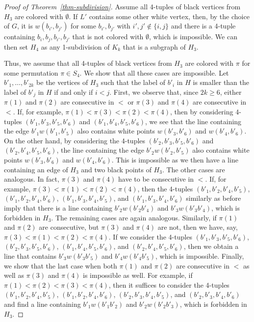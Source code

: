 \documentclass{article}
\begin{document}
\begin{proof}[Proof of Theorem~\ref{thm-subdivision}]
Assume all 4-tuples of black vertices from $H_3$ are colored with $\emptyset$.
If $L'$ contains some other white vertex, then, by the choice of $G$, it is $w(b_{i'},b_{j'})$ for some $b_{i'},b_{j'}$ with $i',j' \notin \{i,j\}$ and there is a 4-tuple containing $b_i,b_j,b_{i'},b_{j'}$ that is not colored with $\emptyset$, which is impossible. 
We can then set $H_4$ as any 1-subdivision of $K_k$ that is a subgraph of $H_3$.

Thus, we assume that all 4-tuples of black vertices from $H_3$ are colored with $\pi$ for some permutation $\pi \in S_4$. 
We show that all these cases are impossible.
Let $b'_1,\dots,b'_{2k}$ be the vertices of $H_3$ such that the label of $b'_i$ in $H$ is smaller than the label of $b'_j$ in $H$ if and only if $i<j$.
First, we observe that, since $2k \geq 6$, either $\pi(1)$ and $\pi(2)$ are consecutive in $<$ or $\pi(3)$ and $\pi(4)$ are consecutive in $<$.
If, for example, $\pi(1)<\pi(3)<\pi(2)<\pi(4)$, then by considering 4-tuples $(b'_1,b'_3,b'_5,b'_6)$ and $(b'_1,b'_4,b'_5,b'_6)$, we see that the line containing the edge $b'_1w(b'_1,b'_5)$ also contains white points $w(b'_3,b'_6)$ and $w(b'_4,b'_6)$.
On the other hand, by considering the 4-tuples $(b'_2,b'_3,b'_5,b'_6)$ and $(b'_2,b'_4,b'_5,b'_6)$, the line containing the edge $b'_2w(b'_2,b'_5)$ also contains white points $w(b'_3,b'_6)$ and $w(b'_4,b'_6)$.
This is impossible as we then have a line containing an edge of $H_3$ and two black points of $H_3$.
The other cases are analogous.
In fact, $\pi(3)$ and $\pi(4)$ have to be consecutive in $<$.
If, for example, $\pi(3)<\pi(1)<\pi(2)<\pi(4)$, then the 4-tuples $(b'_1,b'_2,b'_4,b'_5)$, $(b'_1,b'_2,b'_4,b'_6)$, $(b'_1,b'_3,b'_4,b'_5)$, and $(b'_1,b'_3,b'_4,b'_6)$ similarly as before  imply that there is a line containing $b'_2w(b'_2b'_4)$ and $b'_3w(b'_3b'_4)$, which is forbidden in $H_3$. 
The remaining cases are again analogous.
Similarly, if $\pi(1)$ and $\pi(2)$ are consecutive, but $\pi(3)$ and $\pi(4)$ are not, then we have, say, $\pi(3)<\pi(1)<\pi(2)<\pi(4)$.
If we consider the 4-tuples $(b'_1,b'_3,b'_5,b'_6)$, $(b'_2,b'_3,b'_5,b'_6)$, $(b'_1,b'_4,b'_5,b'_6)$, and $(b'_2,b'_4,b'_5,b'_6)$, then we obtain a line that contains $b'_3w(b'_3b'_5)$ and $b'_4w(b'_4b'_5)$, which is impossible.
Finally, we show that the last case when both $\pi(1)$ and $\pi(2)$ are consecutive in $<$ as well as $\pi(3)$ and $\pi(4)$ is impossible as well.
For example, if $\pi(1)<\pi(2)<\pi(3)<\pi(4)$, then it suffices to consider the 4-tuples $(b'_1,b'_2,b'_4,b'_5)$, $(b'_1,b'_2,b'_4,b'_6)$, $(b'_2,b'_3,b'_4,b'_5)$, and $(b'_2,b'_3,b'_4,b'_6)$ and find a line containing $b'_1w(b'_1b'_2)$ and $b'_2w(b'_2b'_3)$, which is forbidden in $H_3$. 


\end{proof}
\end{document}
